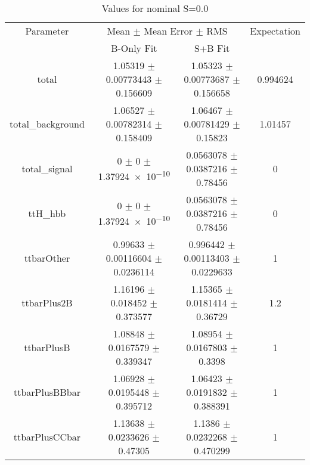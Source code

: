 \begin{table}
\centering
\caption{Values for nominal S=0.0}
\begin{tabular}{cccc}
\toprule
Parameter & \multicolumn{2}{c}{Mean $\pm$ Mean Error $\pm$ RMS} & Expectation\\
 & B-Only Fit & S+B Fit & \\
\midrule
total & \num{1.05319} $\pm$ \num{0.00773443} $\pm$ \num{0.156609} & \num{1.05323} $\pm$ \num{0.00773687} $\pm$ \num{0.156658} & \num{0.994624}\\
total\_background & \num{1.06527} $\pm$ \num{0.00782314} $\pm$ \num{0.158409} & \num{1.06467} $\pm$ \num{0.00781429} $\pm$ \num{0.15823} & \num{1.01457}\\
total\_signal & \num{0} $\pm$ \num{0} $\pm$ \num{1.37924e-10} & \num{0.0563078} $\pm$ \num{0.0387216} $\pm$ \num{0.78456} & \num{0}\\
ttH\_hbb & \num{0} $\pm$ \num{0} $\pm$ \num{1.37924e-10} & \num{0.0563078} $\pm$ \num{0.0387216} $\pm$ \num{0.78456} & \num{0}\\
ttbarOther & \num{0.99633} $\pm$ \num{0.00116604} $\pm$ \num{0.0236114} & \num{0.996442} $\pm$ \num{0.00113403} $\pm$ \num{0.0229633} & \num{1}\\
ttbarPlus2B & \num{1.16196} $\pm$ \num{0.018452} $\pm$ \num{0.373577} & \num{1.15365} $\pm$ \num{0.0181414} $\pm$ \num{0.36729} & \num{1.2}\\
ttbarPlusB & \num{1.08848} $\pm$ \num{0.0167579} $\pm$ \num{0.339347} & \num{1.08954} $\pm$ \num{0.0167803} $\pm$ \num{0.3398} & \num{1}\\
ttbarPlusBBbar & \num{1.06928} $\pm$ \num{0.0195448} $\pm$ \num{0.395712} & \num{1.06423} $\pm$ \num{0.0191832} $\pm$ \num{0.388391} & \num{1}\\
ttbarPlusCCbar & \num{1.13638} $\pm$ \num{0.0233626} $\pm$ \num{0.47305} & \num{1.1386} $\pm$ \num{0.0232268} $\pm$ \num{0.470299} & \num{1}\\
\bottomrule
\end{tabular}
\end{table}